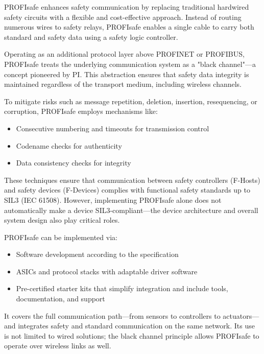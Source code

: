 \documentclass[conference]{IEEEtran}
\begin{document}
PROFIsafe enhances safety communication by replacing traditional hardwired safety circuits with a flexible and cost-effective approach. Instead of routing numerous wires to safety relays, PROFIsafe enables a single cable to carry both standard and safety data using a safety logic controller. 


Operating as an additional protocol layer above PROFINET or PROFIBUS, PROFIsafe treats the underlying communication system as a "black channel"—a concept pioneered by PI. This abstraction ensures that safety data integrity is maintained regardless of the transport medium, including wireless channels.

To mitigate risks such as message repetition, deletion, insertion, resequencing, or corruption, PROFIsafe employs mechanisms like:
\begin{itemize}
    \item Consecutive numbering and timeouts for transmission control
    \item Codename checks for authenticity
    \item Data consistency checks for integrity
\end{itemize}

These techniques ensure that communication between safety controllers (F-Hosts) and safety devices (F-Devices) complies with functional safety standards up to SIL3 (IEC 61508). However, implementing PROFIsafe alone does not automatically make a device SIL3-compliant—the device architecture and overall system design also play critical roles.

PROFIsafe can be implemented via:
\begin{itemize}
    \item Software development according to the specification
    \item ASICs and protocol stacks with adaptable driver software
    \item Pre-certified starter kits that simplify integration and include tools, documentation, and support
\end{itemize}

It covers the full communication path—from sensors to controllers to actuators—and integrates safety and standard communication on the same network. Its use is not limited to wired solutions; the black channel principle allows PROFIsafe to operate over wireless links as well.
\end{document}

